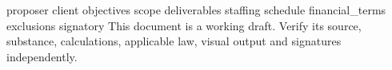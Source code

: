 \documentclass[11pt,a4paper]{article}
\begin{document}
{{proposer}}
{{client}}
{{objectives}}
{{scope}}
{{deliverables}}
{{staffing}}
{{schedule}}
{{financial_terms}}
{{exclusions}}
{{signatory}}
This document is a working draft. Verify its source, substance, calculations, applicable law, visual output and signatures independently.
\end{document}
